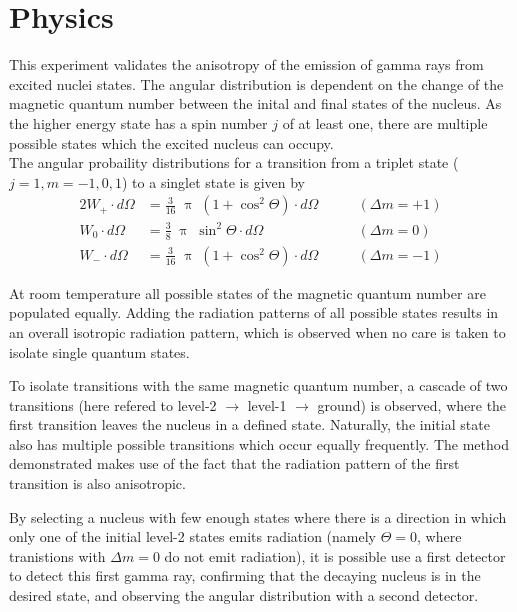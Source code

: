\section{Physics}
This experiment validates  the anisotropy of the emission of gamma rays from excited nuclei states.
The angular distribution is dependent on the change of the magnetic quantum number between the inital and final states of the nucleus.
As the higher energy state has a spin number $j$ of at least one, there are multiple possible states which the excited nucleus can occupy.\\
The angular probaility distributions for a transition from a triplet state ($j=1, m=-1,0,1$) to a singlet state is given by
\begin{alignat}{2}
	W_+ \cdot d\Omega &= \frac{3}{16} \; \uppi \; (1 + \cos^2 \Theta) \cdot d\Omega \qquad &(\Delta m = +1)\\
	W_0 \cdot d\Omega &= \frac{3}{8} \; \uppi \; \sin^2 \Theta \cdot d\Omega \qquad &(\Delta m = 0)\\
	W_- \cdot d\Omega &= \frac{3}{16} \; \uppi \; (1 + \cos^2 \Theta) \cdot d\Omega \qquad &(\Delta m = -1)
\end{alignat}

At room temperature all possible states of the magnetic quantum number are populated equally.
Adding the radiation patterns of all possible states results in an overall isotropic radiation pattern, which is observed when no care is taken to isolate single quantum states.

To isolate transitions with the same magnetic quantum number, a cascade of two transitions (here refered to level-2 $\rightarrow$ level-1 $\rightarrow$ ground) is observed, where the first transition leaves the nucleus in a defined state.
Naturally, the initial state also has multiple possible transitions which occur equally frequently.
The method demonstrated makes use of the fact that the radiation pattern of the first transition is also anisotropic.

By selecting a nucleus with few enough states where there is a direction in which only one of the initial level-2 states emits radiation (namely $\Theta = 0$, where tranistions with $\Delta m = 0$ do not emit radiation), it is possible use a first detector to detect this first gamma ray, confirming that the decaying nucleus is in the desired state, and observing the angular distribution with a second detector.

